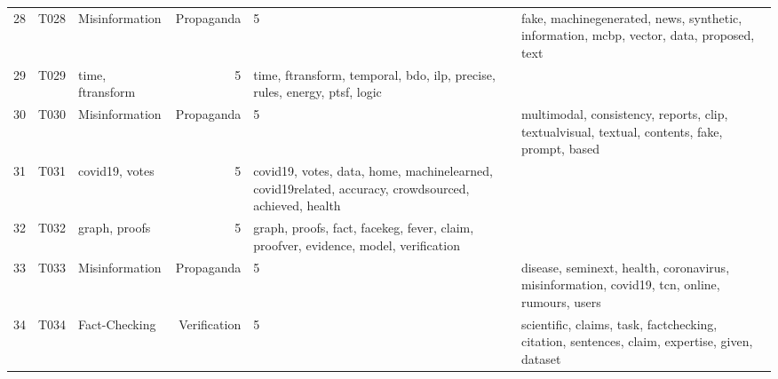 \begin{tabular}{rllrl}
28 & T028 & Misinformation & Propaganda & 5 & fake, machinegenerated, news, synthetic, information, mcbp, vector, data, proposed, text \\
29 & T029 & time, ftransform & 5 & time, ftransform, temporal, bdo, ilp, precise, rules, energy, ptsf, logic \\
30 & T030 & Misinformation & Propaganda & 5 & multimodal, consistency, reports, clip, textualvisual, textual, contents, fake, prompt, based \\
31 & T031 & covid19, votes & 5 & covid19, votes, data, home, machinelearned, covid19related, accuracy, crowdsourced, achieved, health \\
32 & T032 & graph, proofs & 5 & graph, proofs, fact, facekeg, fever, claim, proofver, evidence, model, verification \\
33 & T033 & Misinformation & Propaganda & 5 & disease, seminext, health, coronavirus, misinformation, covid19, tcn, online, rumours, users \\
34 & T034 & Fact-Checking & Verification & 5 & scientific, claims, task, factchecking, citation, sentences, claim, expertise, given, dataset \\
\bottomrule
\end{tabular}
